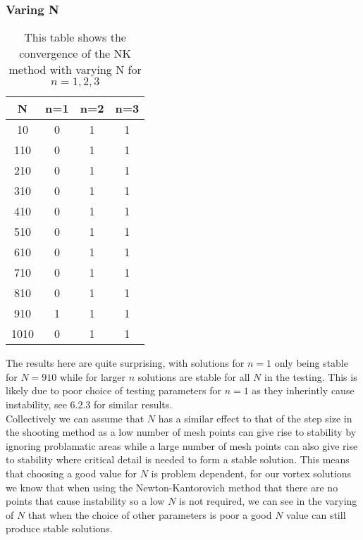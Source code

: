 \documentclass{article}
\begin{document}
\subsubsection{Varing N}
\begin{table}[H]
\centering
\begin{tabular}{|c|c|c|c|}
\hline
N & n=1 &  n=2 &  n=3 \\
\hline
10   & 0 & 1 & 1\\
110  & 0 & 1 & 1\\
210  & 0 & 1 & 1\\
310  & 0 & 1 & 1\\
410  & 0 & 1 & 1\\
510  & 0 & 1 & 1\\
610  & 0 & 1 & 1\\
710  & 0 & 1 & 1\\
810  & 0 & 1 & 1\\
910  & 1 & 1 & 1\\
1010 & 0 & 1 & 1\\
\hline
\end{tabular}
\caption{This table shows the convergence of the NK method with varying N for $n=1,2,3$}
\end{table}
The results here are quite surprising, with solutions for $n=1$ only being stable for $N=910$ while for larger $n$ solutions are stable for all $N$ in the testing. This is likely due to poor choice of testing parameters for $n=1$ as they inherintly cause instability, see 6.2.3 for similar results. \\
Collectively we can assume that $N$ has a similar effect to that of the step size in the shooting method as a low number of mesh points can give rise to stability by ignoring problamatic areas while a large number of mesh points can also give rise to stability where critical detail is needed to form a stable solution. This means that choosing a good value for $N$ is problem dependent, for our vortex solutions we know that when using the Newton-Kantorovich method that there are no points that cause instability so a low $N$ is not required, we can see in the varying of $N$ that when the choice of other parameters is poor a good $N$ value can still produce stable solutions. 
\end{document}
